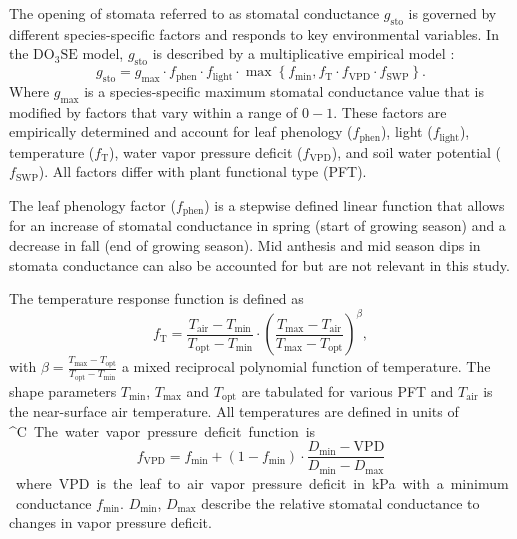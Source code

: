 \documentclass[bg, manuscript]{copernicus}
\begin{document}
The opening of stomata referred to as stomatal conductance $g_\mathrm{sto}$ is governed by different species-specific factors and responds to key environmental variables. In the $\mathrm{DO_3SE}$ model, $g_\mathrm{sto}$ is described by a multiplicative empirical model \citep{PTRS:Jarvis1976,Emberson2000,ICP:MappingManual2017}:
\begin{equation}
  g_\text{sto} = g_\text{max} \cdot f_\text{phen} \cdot f_\text{light} \cdot \max{\left\{f_\text{min}, f_\mathrm{T} \cdot f_\mathrm{VPD} \cdot f_\text{SWP}\right\}}.
  \label{eq:stomatal}
\end{equation}
%
Where $g_\mathrm{max}$ is a species-specific maximum stomatal conductance value that is modified by factors that vary within a range of $0-1$. These factors are empirically determined and account for leaf phenology ($f_\text{phen}$), light ($f_\text{light}$), temperature ($f_\mathrm{T}$), water vapor pressure deficit ($f_\mathrm{VPD}$), and soil water potential ($f_\text{SWP}$). All factors differ with plant functional type (PFT).

The leaf phenology factor ($f_\mathrm{phen}$) is a stepwise defined linear function that allows for an increase of stomatal conductance in spring (start of growing season) and a decrease in fall (end of growing season). Mid anthesis and mid season dips in stomata conductance can also be accounted for but are not relevant in this study. 

The temperature response function is defined as
%
\begin{equation}
  f_\mathrm{T} = \frac{T_\text{air}-T_\text{min}}{T_\text{opt}-T_\text{min}} \cdot \left(\frac{T_{\text{max}}-T_\text{air}}{T_{\text{max}}-T_\text{opt}}\right)^\beta,
  \label{eq:f_temp}
\end{equation}
with $\beta = \frac{T_\text{max}-T_\text{opt}}{T_\text{opt}-T_\text{min}}$ a mixed reciprocal polynomial function of temperature. The shape parameters $T_\text{min}$, $T_\text{max}$ and $T_\text{opt}$ are tabulated for various PFT and $T_\mathrm{air}$ is the near-surface air temperature. All temperatures are defined in units of \unit{^\circ C}.

The water vapor pressure deficit function is
%
\begin{equation}
  f_\mathrm{VPD} = f_\text{min}+(1-f_\text{min}) \cdot \frac{D_\text{min} - \text{VPD}}{D_\text{min}-D_\text{max}}
  \label{eq:f_vpd}
\end{equation}
%
where VPD is the leaf to air vapor pressure deficit in \unit{kPa} with a minimum conductance $f_\text{min}$. $D_\text{min}$, $D_\text{max}$ describe the relative stomatal conductance to changes in vapor pressure deficit.
\end{document}
